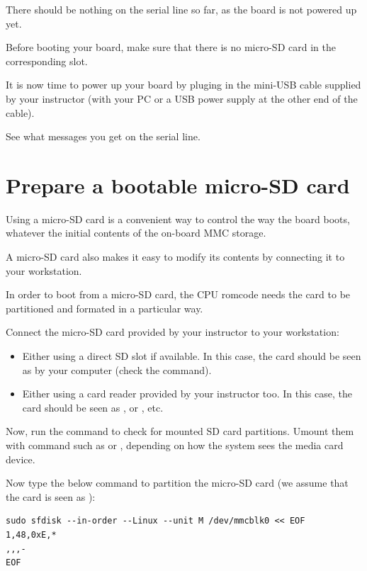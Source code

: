 There should be nothing on the serial line so far, as the board is not
powered up yet.

Before booting your board, make sure that there is no micro-SD card
in the corresponding slot.

It is now time to power up your board by pluging in the mini-USB
cable supplied by your instructor (with your PC or a USB power supply at the
other end of the cable).

See what messages you get on the serial line.

\section{Prepare a bootable micro-SD card}

Using a micro-SD card is a convenient way to control the way
the board boots, whatever the initial contents of the on-board MMC
storage.

A micro-SD card also makes it easy to modify its contents by connecting
it to your workstation.

In order to boot from a micro-SD card, the CPU romcode needs the card
to be partitioned and formated in a particular way.

Connect the micro-SD card provided by your instructor to your
workstation:

\begin{itemize}
\item Either using a direct SD slot if available.
      In this case, the card should be seen as  by
      your computer (check the  command).
\item Either using a card reader provided by your instructor too.
      In this case, the card should be seen as , or
      , etc.
\end{itemize}

Now, run the  command to check for mounted SD card
partitions. Umount them with command such as  or , depending on how
the system sees the media card device.

Now type the below command to partition the micro-SD card
(we assume that the card is seen as ):

\begin{verbatim}
sudo sfdisk --in-order --Linux --unit M /dev/mmcblk0 << EOF
1,48,0xE,*
,,,-
EOF
\end{verbatim}

